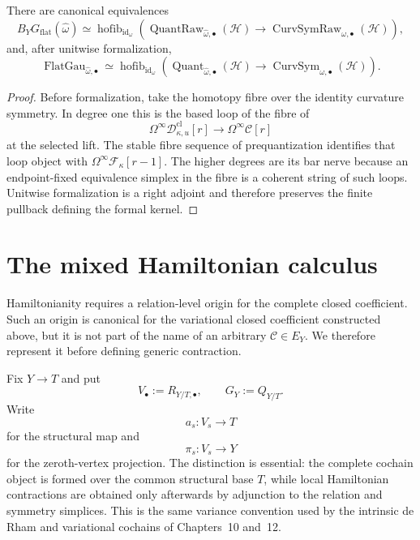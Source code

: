 \begin{theorem}
\label{thm:prequantum-flat-gauge-curvature-kernel}
There are canonical equivalences
\[
\boxed{
B_YG_{\mathrm{flat}}(\widehat\omega)
\simeq
\operatorname{hofib}_{\mathrm{id}_\omega}
\left(
\operatorname{QuantRaw}_{\widehat\omega,\bullet}(\mathcal H)
\longrightarrow
\operatorname{CurvSymRaw}_{\omega,\bullet}(\mathcal H)
\right),
}
\]
and, after unitwise formalization,
\[
\boxed{
\operatorname{FlatGau}_{\widehat\omega,\bullet}
\simeq
\operatorname{hofib}_{\mathrm{id}_\omega}
\left(
\operatorname{Quant}_{\widehat\omega,\bullet}(\mathcal H)
\longrightarrow
\operatorname{CurvSym}_{\omega,\bullet}(\mathcal H)
\right).
}
\]
\end{theorem}

\begin{proof}
Before formalization, take the homotopy fibre over the identity curvature
symmetry.  In degree one this is the based loop of the fibre of
\[
\Omega^\infty
\mathscr D^{\mathrm{cl}}_{\kappa,u}[r]
\longrightarrow
\Omega^\infty\mathscr C[r]
\]
at the selected lift.  The stable fibre sequence of prequantization identifies
that loop object with $\Omega^\infty\mathscr F_\kappa[r-1]$.  The higher degrees
are its bar nerve because an endpoint-fixed equivalence simplex in the fibre is a
coherent string of such loops.  Unitwise formalization is a right adjoint and
therefore preserves the finite pullback defining the formal kernel.
\end{proof}

\section{The mixed Hamiltonian calculus}
\label{sec:prequantum-hamiltonian-realization}

Hamiltonianity requires a relation-level origin for the complete closed
coefficient.  Such an origin is canonical for the variational closed coefficient
constructed above, but it is not part of the name of an arbitrary
$\mathscr C\in E_Y$.  We therefore represent it before defining generic
contraction.

Fix $Y\to T$ and put
\[
V_\bullet:=R_{Y/T,\bullet},
\qquad
G_Y:=Q_{Y/T}.
\]
Write
\[
a_s:V_s\longrightarrow T
\]
for the structural map and
\[
\pi_s:V_s\longrightarrow Y
\]
for the zeroth-vertex projection.  The distinction is essential: the complete
cochain object is formed over the common structural base $T$, while local
Hamiltonian contractions are obtained only afterwards by adjunction to the
relation and symmetry simplices.  This is the same variance convention used by
the intrinsic de Rham and variational cochains of Chapters~10 and~12.

